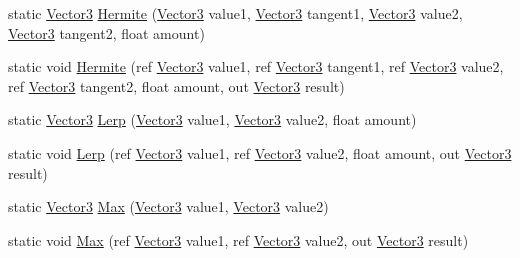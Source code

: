 \begin{DoxyCompactItemize}
\item 
static \hyperlink{structMicrosoft_1_1Xna_1_1Framework_1_1Vector3}{Vector3} \hyperlink{structMicrosoft_1_1Xna_1_1Framework_1_1Vector3_af20350bf96c736aaa815ac9ea1e13a94}{Hermite} (\hyperlink{structMicrosoft_1_1Xna_1_1Framework_1_1Vector3}{Vector3} value1, \hyperlink{structMicrosoft_1_1Xna_1_1Framework_1_1Vector3}{Vector3} tangent1, \hyperlink{structMicrosoft_1_1Xna_1_1Framework_1_1Vector3}{Vector3} value2, \hyperlink{structMicrosoft_1_1Xna_1_1Framework_1_1Vector3}{Vector3} tangent2, float amount)
\item 
static void \hyperlink{structMicrosoft_1_1Xna_1_1Framework_1_1Vector3_ae3399ee07aadfb55dc2e3041755d9468}{Hermite} (ref \hyperlink{structMicrosoft_1_1Xna_1_1Framework_1_1Vector3}{Vector3} value1, ref \hyperlink{structMicrosoft_1_1Xna_1_1Framework_1_1Vector3}{Vector3} tangent1, ref \hyperlink{structMicrosoft_1_1Xna_1_1Framework_1_1Vector3}{Vector3} value2, ref \hyperlink{structMicrosoft_1_1Xna_1_1Framework_1_1Vector3}{Vector3} tangent2, float amount, out \hyperlink{structMicrosoft_1_1Xna_1_1Framework_1_1Vector3}{Vector3} result)
\item 
static \hyperlink{structMicrosoft_1_1Xna_1_1Framework_1_1Vector3}{Vector3} \hyperlink{structMicrosoft_1_1Xna_1_1Framework_1_1Vector3_a6c9a61c90c6655404f158640d00946a7}{Lerp} (\hyperlink{structMicrosoft_1_1Xna_1_1Framework_1_1Vector3}{Vector3} value1, \hyperlink{structMicrosoft_1_1Xna_1_1Framework_1_1Vector3}{Vector3} value2, float amount)
\item 
static void \hyperlink{structMicrosoft_1_1Xna_1_1Framework_1_1Vector3_a4d38b01d8c14a9fc3d392fceaf939325}{Lerp} (ref \hyperlink{structMicrosoft_1_1Xna_1_1Framework_1_1Vector3}{Vector3} value1, ref \hyperlink{structMicrosoft_1_1Xna_1_1Framework_1_1Vector3}{Vector3} value2, float amount, out \hyperlink{structMicrosoft_1_1Xna_1_1Framework_1_1Vector3}{Vector3} result)
\item 
static \hyperlink{structMicrosoft_1_1Xna_1_1Framework_1_1Vector3}{Vector3} \hyperlink{structMicrosoft_1_1Xna_1_1Framework_1_1Vector3_a3a1cbf1afd8ba89278283fd693b0f5f6}{Max} (\hyperlink{structMicrosoft_1_1Xna_1_1Framework_1_1Vector3}{Vector3} value1, \hyperlink{structMicrosoft_1_1Xna_1_1Framework_1_1Vector3}{Vector3} value2)
\item 
static void \hyperlink{structMicrosoft_1_1Xna_1_1Framework_1_1Vector3_aa6f1d7f0afc9e6f82b73c2a2f1288bb9}{Max} (ref \hyperlink{structMicrosoft_1_1Xna_1_1Framework_1_1Vector3}{Vector3} value1, ref \hyperlink{structMicrosoft_1_1Xna_1_1Framework_1_1Vector3}{Vector3} value2, out \hyperlink{structMicrosoft_1_1Xna_1_1Framework_1_1Vector3}{Vector3} result)

\end{DoxyCompactItemize}
